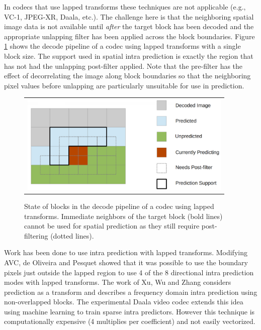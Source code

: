 \documentclass[a4paper]{spie}  %
\begin{document}
In codecs that use lapped transforms these techniques are not applicable (e.g.,
 VC-1, JPEG-XR, Daala, etc.).
The challenge here is that the neighboring spatial image data is not available
 until {\em after} the target block has been decoded and the appropriate
 unlapping filter has been applied across the block boundaries.
Figure \ref{fig:decode} shows the decode pipeline of a codec using lapped
 transforms with a single block size.
The support used in spatial intra prediction is exactly the region that has not
 had the unlapping post-filter applied.
Note that the pre-filter has the effect of decorrelating the image along block
 boundaries so that the neighboring pixel values before unlapping are
 particularly unsuitable for use in prediction.

\begin{figure}
\begin{center}
\begin{tabular}{c}
\includegraphics[natwidth=1376,natheight=646,width=4in]{daala_decode.png}
\end{tabular}
\end{center}
\caption[example]{\label{fig:decode} State of blocks in the decode pipeline of
 a codec using lapped transforms. Immediate neighbors of the target block
 (bold lines) cannot be used for spatial prediction as they still require
 post-filtering (dotted lines).}
\end{figure}


Work has been done to use intra prediction with lapped transforms.
Modifying AVC, de Oliveira and Pesquet showed that it was possible to use the
 boundary pixels just outside the lapped region to use 4 of the 8 directional
 intra prediction modes with lapped transforms\cite{oliv2011}.
The work of Xu, Wu and Zhang considers prediction as a transform and describes
 a frequency domain intra prediction using non-overlapped blocks\cite{xuwu2009}.
The experimental Daala video codec extends this idea using machine learning to
 train sparse intra predictors\cite{DaalaDemo2}.
However this technique is computationally expensive (4 multiplies per
 coefficient) and not easily vectorized.
\end{document}

